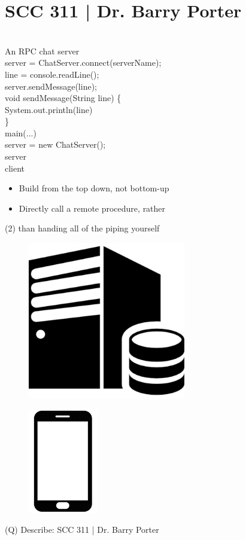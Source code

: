 \documentclass[12pt]{article}
\begin{document}
\section{SCC 311 | Dr. Barry Porter}
\\
An RPC chat server\\
server = ChatServer.connect(serverName);\\
line = console.readLine();\\
server.sendMessage(line);\\
void sendMessage(String line) \{\\
System.out.println(line)\\
\}\\
main(...)\\
server = new ChatServer();\\
server\\
client\\
\begin{itemize}
  \item Build from the top down, not bottom-up
  \item Directly call a remote procedure, rather
\end{itemize}(2)
than handing all of the piping yourself\\
\begin{figure}[H]
\includegraphics[width=0.5\linewidth]{page8-image-1.png}
\end{figure}
\begin{figure}[H]
\includegraphics[width=0.5\linewidth]{page8-image-2.png}
\end{figure}
\clearpage
(Q)
Describe: SCC 311 | Dr. Barry Porter
\clearpage
\end{document}
